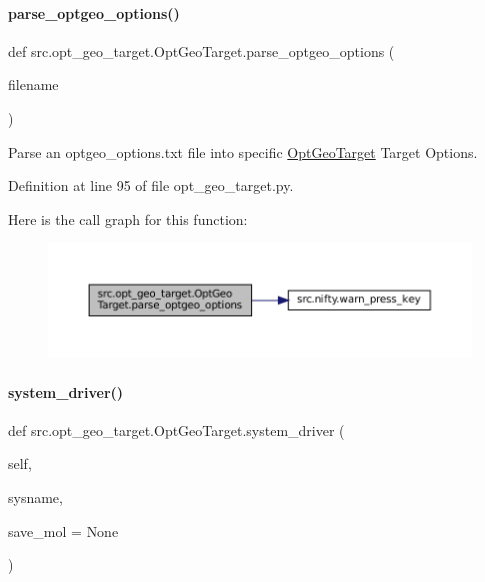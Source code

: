 \paragraph{\texorpdfstring{parse\+\_\+optgeo\+\_\+options()}{parse\_optgeo\_options()}}
{\footnotesize\ttfamily def src.\+opt\+\_\+geo\+\_\+target.\+Opt\+Geo\+Target.\+parse\+\_\+optgeo\+\_\+options (\begin{DoxyParamCaption}\item[{}]{filename }\end{DoxyParamCaption})\hspace{0.3cm}{\ttfamily [static]}}



Parse an optgeo\+\_\+options.\+txt file into specific \hyperlink{classsrc_1_1opt__geo__target_1_1OptGeoTarget}{Opt\+Geo\+Target} Target Options. 



Definition at line 95 of file opt\+\_\+geo\+\_\+target.\+py.

Here is the call graph for this function\+:
\nopagebreak
\begin{figure}[H]
\begin{center}
\leavevmode
\includegraphics[width=350pt]{classsrc_1_1opt__geo__target_1_1OptGeoTarget_ad20376e926556e19798b72be33516ba9_cgraph}
\end{center}
\end{figure}
\mbox{\label{classsrc_1_1opt__geo__target_1_1OptGeoTarget_a9ce6a2e6b4a9e7ee4e72de8287ddccba}} 
\paragraph{\texorpdfstring{system\+\_\+driver()}{system\_driver()}}
{\footnotesize\ttfamily def src.\+opt\+\_\+geo\+\_\+target.\+Opt\+Geo\+Target.\+system\+\_\+driver (\begin{DoxyParamCaption}\item[{}]{self,  }\item[{}]{sysname,  }\item[{}]{save\+\_\+mol = {\ttfamily None} }\end{DoxyParamCaption})}



